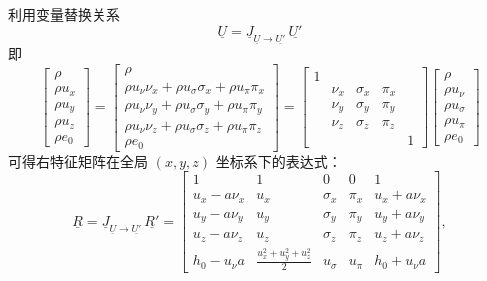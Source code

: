 利用变量替换关系
\begin{equation}
\underline{U}=\underline{J}_{\underline{U}\to\underline{U'}}\,\underline{U'}
\end{equation}
即
\begin{equation}
\begin{bmatrix}\rho\\
\rho u_{x}\\
\rho u_{y}\\
\rho u_{z}\\
\rho e_{0}
\end{bmatrix}=\begin{bmatrix}\rho\\
\rho u_{\nu}\nu_{x}+\rho u_{\sigma}\sigma_{x}+\rho u_{\pi}\pi_{x}\\
\rho u_{\nu}\nu_{y}+\rho u_{\sigma}\sigma_{y}+\rho u_{\pi}\pi_{y}\\
\rho u_{\nu}\nu_{z}+\rho u_{\sigma}\sigma_{z}+\rho u_{\pi}\pi_{z}\\
\rho e_{0}
\end{bmatrix}=\begin{bmatrix}1\\
 & \nu_{x} & \sigma_{x} & \pi_{x}\\
 & \nu_{y} & \sigma_{y} & \pi_{y}\\
 & \nu_{z} & \sigma_{z} & \pi_{z}\\
 &  &  &  & 1
\end{bmatrix}\begin{bmatrix}\rho\\
\rho u_{\nu}\\
\rho u_{\sigma}\\
\rho u_{\pi}\\
\rho e_{0}
\end{bmatrix}
\end{equation}
可得右特征矩阵在全局 $(x,y,z)$ 坐标系下的表达式：
\begin{equation}
\underline{R}=\underline{J}_{\underline{U}\to\underline{U'}}\,\underline{R'}=\begin{bmatrix}1 & 1 & 0 & 0 & 1\\
u_{x}-a\nu_{x} & u_{x} & \sigma_{x} & \pi_{x} & u_{x}+a\nu_{x}\\
u_{y}-a\nu_{y} & u_{y} & \sigma_{y} & \pi_{y} & u_{y}+a\nu_{y}\\
u_{z}-a\nu_{z} & u_{z} & \sigma_{z} & \pi_{z} & u_{z}+a\nu_{z}\\
h_{0}-u_{\nu}a & \frac{u_{x}^{2}+u_{y}^{2}+u_{z}^{2}}{2} & u_{\sigma} & u_{\pi} & h_{0}+u_{\nu}a
\end{bmatrix},
\end{equation}
